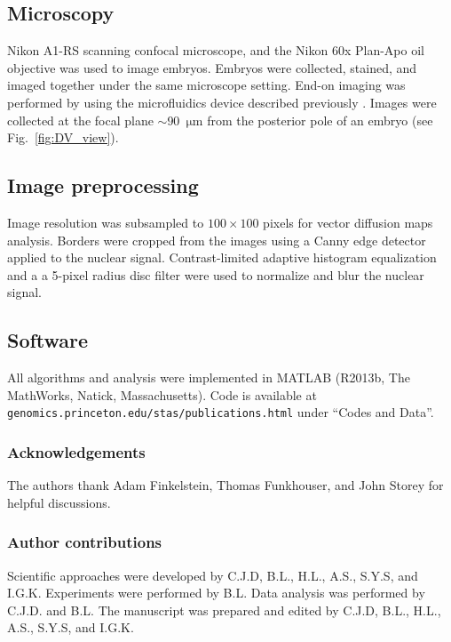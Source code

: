 \documentclass[twocolumn, 10pt]{article}
\newcommand{\fig}[0]{Fig.}
\begin{document}
\subsection*{Microscopy}
%
Nikon A1-RS scanning confocal microscope, and the Nikon 60x Plan-Apo oil objective was used to image embryos. 
%
Embryos were collected, stained, and imaged together under the same microscope setting. 
%
End-on imaging was performed by using the microfluidics device described previously \citep{chung2010microfluidic}.
%
Images were collected at the focal plane $\sim$90~$\mathrm{\mu m}$ from the posterior pole of an embryo (see \fig~\ref{fig:DV_view}).  

\subsection*{Image preprocessing}
%
Image resolution was subsampled to $100 \times 100$ pixels for vector diffusion maps analysis.
%
Borders were cropped from the images using a Canny edge detector applied to the nuclear signal. 
%
Contrast-limited adaptive histogram equalization and a a 5-pixel radius disc filter were used to normalize and blur the nuclear signal.

\subsection*{Software}
%
All algorithms and analysis were implemented in MATLAB\textsuperscript{\textregistered} (R2013b, The MathWorks, Natick, Massachusetts).
%
Code is available at \texttt{genomics.princeton.edu/stas/publications.html} under ``Codes and Data''. 




\subsubsection*{Acknowledgements}

The authors thank Adam Finkelstein,  Thomas Funkhouser, and John Storey for helpful discussions. 


\subsubsection*{Author contributions}
Scientific approaches were developed by C.J.D, B.L., H.L., A.S., S.Y.S, and I.G.K.
%
Experiments were performed by B.L.
%
Data analysis was performed by C.J.D. and B.L.
%
The manuscript was prepared and edited by C.J.D, B.L., H.L., A.S., S.Y.S, and I.G.K.
\end{document}
